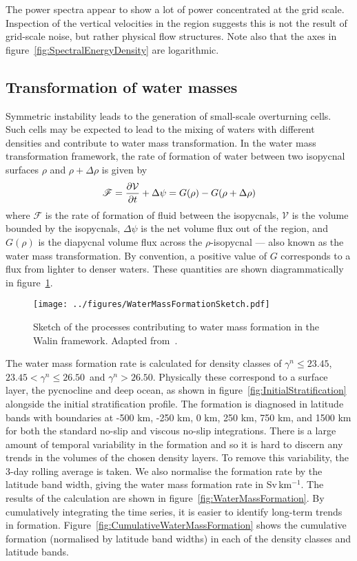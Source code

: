The power spectra appear to show a lot of power concentrated at the grid scale. Inspection of the vertical velocities in the region suggests this is not the result of grid-scale noise, but rather physical flow structures. Note also that the axes in figure~\ref{fig:SpectralEnergyDensity} are logarithmic.

\subsection{Transformation of water masses}
\label{subsubsec:WaterMassTransformation}
Symmetric instability leads to the generation of small-scale overturning cells. Such cells may be expected to lead to the mixing of waters with different densities and contribute to water mass transformation. In the \citet{Walin1982} water mass transformation framework, the rate of formation of water between two isopycnal surfaces $\rho$ and $\rho + \Delta \rho$ is given by
\begin{equation}
    \mathscr{F} = \pdv{\mathcal{V}}{t} + \Delta \psi = G(\rho) - G(\rho + \Delta \rho)
    \label{eq:WallinFormation}
\end{equation}
where $\mathscr{F}$ is the rate of formation of fluid between the isopycnals, $\mathcal{V}$ is the volume bounded by the isopycnals, $\Delta \psi$ is the net volume flux out of the region, and $G(\rho)$ is the diapycnal volume flux across the $\rho$-isopycnal --- also known as the water mass transformation. By convention, a positive value of $G$ corresponds to a flux from lighter to denser waters. These quantities are shown diagrammatically in figure~\ref{fig:WaterMassFormationSketch}.

\begin{figure} 
    \centering
    \texttt{[image: ../figures/WaterMassFormationSketch.pdf]}
    \caption{Sketch of the processes contributing to water mass formation in the Walin framework. Adapted from~\citet{Williams2011}.}
    \label{fig:WaterMassFormationSketch}
\end{figure}

The water mass formation rate is calculated for density classes of $\gamma^n \leq 23.45$, $23.45 < \gamma^n \leq 26.50$~and $\gamma^n > 26.50$. Physically these correspond to a surface layer, the pycnocline and deep ocean, as shown in figure~\ref{fig:InitialStratification} alongside the initial stratification profile. The formation is diagnosed in latitude bands with boundaries at -500 km, -250 km, 0 km, 250 km, 750 km, and 1500 km for both the standard no-slip and viscous no-slip integrations. There is a large amount of temporal variability in the formation and so it is hard to discern any trends in the volumes of the chosen density layers. To remove this variability, the 3-day rolling average is taken. We also normalise the formation rate by the latitude band width, giving the water mass formation rate in Sv\,km$^{-1}$. The results of the calculation are shown in figure~\ref{fig:WaterMassFormation}. By cumulatively integrating the time series, it is easier to identify long-term trends in formation. Figure~\ref{fig:CumulativeWaterMassFormation} shows the cumulative formation (normalised by latitude band widths) in each of the density classes and latitude bands.

